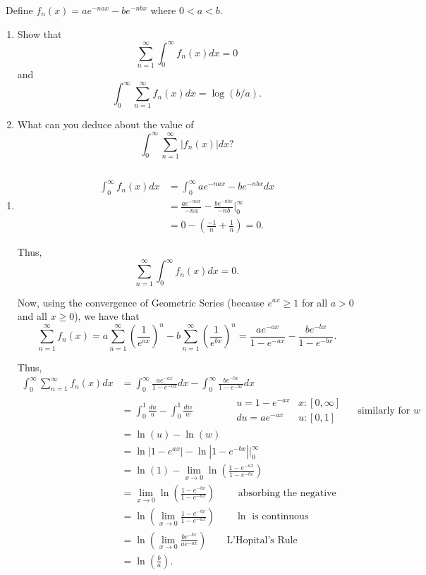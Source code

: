 \documentclass[12pt]{Homework}
\begin{document}
\begin{problem} $\,$
Define $f_n(x)=ae^{-nax}-be^{-nbx}$ where $0<a<b$.
\begin{enumerate}[label=(\alph*)]
    \item Show that $$\sum_{n=1}^\infty\int_0^\infty f_n(x)dx=0$$ and $$\int_0^\infty\sum_{n=1}^\infty f_n(x)dx=\log(b/a).$$
    \item What can you deduce about the value of $$\int_0^\infty\sum_{n=1}^\infty|f_n(x)|dx?$$
\end{enumerate}
\end{problem}


\begin{solution}$\,$
\begin{enumerate}[label=(\alph*)]
    \item \begin{align*}
        \int_0^\infty f_n(x)dx&=\int_0^\infty ae^{-nax}-be^{-nbx}dx\\
        &=\frac{ae^{-nax}}{-na}-\frac{be^{-nbx}}{-nb}\bigg|_0^\infty\\
        &=0-\left(\frac{-1}{n}+\frac{1}{n}\right)=0.
    \end{align*}
    
    Thus, $$\sum_{n=1}^\infty\int_0^\infty f_n(x)dx=0.$$ 
    
    Now, using the convergence of Geometric Series (because $e^{ax}\ge1$ for all $a>0$ and all $x\ge0$), we have that $$\sum_{n=1}^\infty f_n(x)=a\sum_{n=1}^\infty\left(\frac{1}{e^{ax}}\right)^n-b\sum_{n=1}^\infty\left(\frac{1}{e^{bx}}\right)^n=\frac{ae^{-ax}}{1-e^{-ax}}-\frac{be^{-bx}}{1-e^{-bx}}.$$
    
    Thus, \begin{align*}
        \int_0^\infty\sum_{n=1}^\infty f_n(x)dx&=\int_0^\infty\frac{ae^{-ax}}{1-e^{-ax}}dx-\int_0^\infty\frac{be^{-bx}}{1-e^{-bx}}dx\\
        &=\int_0^1\frac{du}{u}-\int_0^1\frac{dw}{w}\qquad\qquad \begin{matrix}
    u=1-e^{-ax} &   x:[0,\infty]\\
    du=ae^{-ax} & u:[0,1]
\end{matrix}\quad\text{ similarly for }w\\
        &=\ln(u)-\ln(w)\\
        &=\ln|1-e^{ax}|-\ln|1-e^{-bx}|\bigg|_0^\infty\\
        &=\ln(1)-\lim_{x\to0}\ln\left(\frac{1-e^{-ax}}{1-e^{-bx}}\right)\\
        &=\lim_{x\to0}\ln\left(\frac{1-e^{-bx}}{1-e^{-ax}}\right)\qquad\text{ absorbing the negative}\\
        &=\ln\left(\lim_{x\to0}\frac{1-e^{-bx}}{1-e^{-ax}}\right)\qquad\ln \text{ is continuous}\\
        &=\ln\left(\lim_{x\to0}\frac{be^{-bx}}{ae^{-ax}}\right)\qquad\text{L'Hopital's Rule}\\
        &=\ln\left(\frac{b}{a}\right).
    \end{align*}
   

\end{enumerate}
\end{solution}
\end{document}
